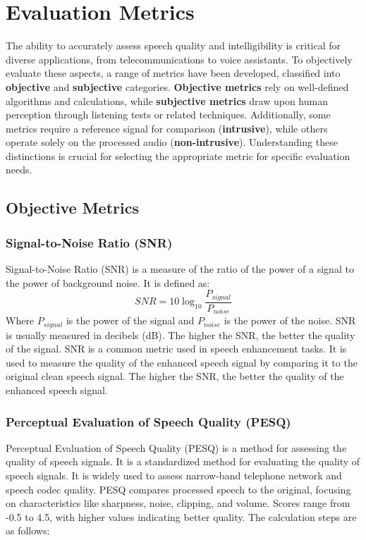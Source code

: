 \chapter{Evaluation Metrics}
\label{chap:metrics}
The ability to accurately assess speech quality and intelligibility is critical for diverse applications, from telecommunications to voice assistants. To objectively evaluate these aspects, a range of metrics have been developed, classified into \textbf{objective} and \textbf{subjective} categories. \textbf{Objective metrics} rely on well-defined algorithms and calculations, while \textbf{subjective metrics} draw upon human perception through listening tests or related techniques. Additionally, some metrics require a reference signal for comparison (\textbf{intrusive}), while others operate solely on the processed audio (\textbf{non-intrusive}). Understanding these distinctions is crucial for selecting the appropriate metric for specific evaluation needs.

\begingroup
\let\clearpage\relax

\section{Objective Metrics}
\subsection{Signal-to-Noise Ratio (SNR)}
Signal-to-Noise Ratio (SNR) is a measure of the ratio of the power of a signal to the power of background noise. It is defined as:
\begin{equation}
    SNR = 10 \log_{10} \frac{P_{signal}}{P_{noise}}
\end{equation}
Where $P_{signal}$ is the power of the signal and $P_{noise}$ is the power of the noise. SNR is usually measured in decibels (dB). The higher the SNR, the better the quality of the signal. SNR is a common metric used in speech enhancement tasks. It is used to measure the quality of the enhanced speech signal by comparing it to the original clean speech signal. The higher the SNR, the better the quality of the enhanced speech signal.

\subsection{Perceptual Evaluation of Speech Quality (PESQ)}
Perceptual Evaluation of Speech Quality (PESQ) is a method for assessing the quality of speech signals. It is a standardized method for evaluating the quality of speech signals. It is widely used to assess narrow-band telephone network and speech codec quality. PESQ compares processed speech to the original, focusing on characteristics like sharpness, noise, clipping, and volume. Scores range from -0.5 to 4.5, with higher values indicating better quality. The calculation steps are as follows:

